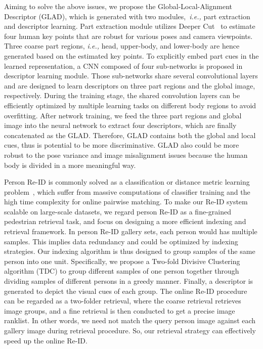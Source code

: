 \documentclass[sigconf]{acmart}
\begin{document}
Aiming to solve the above issues, we propose the Global-Local-Alignment Descriptor (GLAD), which is generated with two modules,~\emph{i.e.,} part extraction and descriptor learning. Part extraction module utilizes Deeper Cut~\cite{DeeperCut} to estimate four human key points that are robust for various poses and camera viewpoints. Three coarse part regions, \emph{i.e.,} head, upper-body, and lower-body are hence generated based on the estimated key points. To explicitly embed part cues in the learned representation, a CNN composed of four sub-networks is proposed in descriptor learning module. Those sub-networks share several convolutional layers and are designed to learn descriptors on three part regions and the global image, respectively. During the training stage, the shared convolution layers can be efficiently optimized by multiple learning tasks on different body regions to avoid overfitting. After network training, we feed the three part regions and global image into the neural network to extract four descriptors, which are finally concatenated as the GLAD. Therefore, GLAD contains both the global and local cues, thus is potential to be more discriminative. GLAD also could be more robust to the pose variance and image misalignment issues because the human body is divided in a more meaningful way.

Person Re-ID is commonly solved as a classification or distance metric learning problem~\cite{yi2014deep, wu2016personnet,ahmed2015improved,WARCA, LOMOXQAD, LDNS, Su3, Su4}, which suffer from massive computations of classifier training and the high time complexity for online pairwise matching. To make our Re-ID system scalable on large-scale datasets, we regard person Re-ID as a fine-grained pedestrian retrieval task, and focus on designing a more efficient indexing and retrieval framework. In person Re-ID gallery sets, each person would has multiple samples. This implies data redundancy and could be optimized by indexing strategies. Our indexing algorithm is thus designed to group samples of the same person into one unit. Specifically, we propose a Two-fold Divisive Clustering algorithm (TDC) to group different samples of one person together through dividing samples of different persons in a greedy manner. Finally, a descriptor is generated to depict the visual cues of each group. The online Re-ID procedure can be regarded as a two-folder retrieval, where the coarse retrieval retrieves image groups, and a fine retrieval is then conducted to get a precise image ranklist. In other words, we need not match the query person image against each gallery image during retrieval procedure. So, our retrieval strategy can effectively speed up the online Re-ID.
\end{document}
